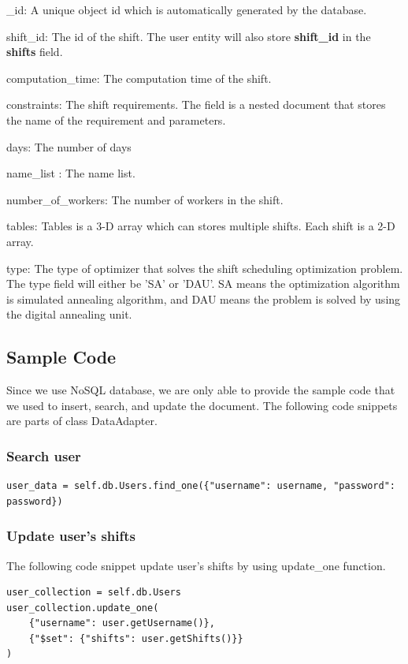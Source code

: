 \documentclass[11pt, oneside]{article}   	%
\begin{document}
\begin{compactenum}[1.]
\item \_id: A unique object id which is automatically generated by the database.
\item shift\_id: The id of the shift. The user entity will also store \textbf{shift\_id} in the \textbf{shifts} field.
\item computation\_time: The computation time of the shift.
\item constraints: The shift requirements. The field is a nested document that stores the name of the requirement and parameters.
\item days: The number of days
\item name\_list : The name list.
\item number\_of\_workers: The number of workers in the shift.
\item tables: Tables is a 3-D array which can stores multiple shifts. Each shift is a 2-D array.
\item type: The type of optimizer that solves the shift scheduling optimization problem. The type field will either be 'SA' or 'DAU'. SA means the optimization algorithm is simulated annealing algorithm, and DAU means the problem is solved by using the digital annealing unit.
\end{compactenum}

\subsection{Sample Code}

Since we use NoSQL database, we are only able to provide the sample code that we used to insert, search, and  update the document.
The following code snippets are parts of class DataAdapter.

\subsubsection{Search user}
\begin{verbatim}
user_data = self.db.Users.find_one({"username": username, "password": password})
\end{verbatim}

\subsubsection{Update user's shifts}
The following code snippet update user's shifts by using update\_one function.
\begin{verbatim}
user_collection = self.db.Users
user_collection.update_one(
	{"username": user.getUsername()}, 
	{"$set": {"shifts": user.getShifts()}}
)
\end{verbatim}
\end{document}
